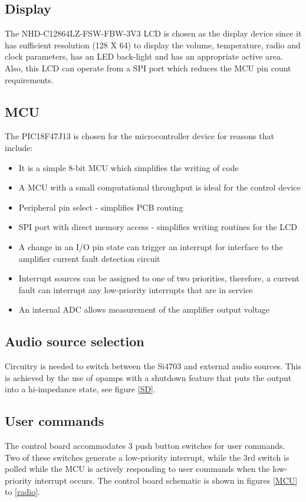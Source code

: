 \documentclass[a4paper,10pt, oneside]{article}
\begin{document}
\subsection*{Display}
The NHD-C12864LZ-FSW-FBW-3V3 LCD is chosen as the display device since it has sufficient resolution (128 X 64) to display the volume, 
temperature, radio and clock parameters, has an LED back-light and has an appropriate active area. Also, this LCD can operate from a 
SPI port which reduces the MCU pin count requirements. 
\subsection*{MCU}
The PIC18F47J13 is chosen for the microcontroller device for reasons that include:
\begin{itemize}
	\item It is a simple 8-bit MCU which simplifies the writing of code
	\item A MCU with a small computational throughput is ideal for the control device
	\item Peripheral pin select - simplifies PCB routing
	\item SPI port with direct memory access - simplifies writing routines for the LCD
	\item A change in an I/O pin state can trigger an interrupt for interface to the 
	amplifier current fault detection circuit
	\item Interrupt sources can be assigned to one of two priorities, therefore, a current fault can interrupt any 
	low-priority interrupts that are in service
	\item An internal ADC allows measurement of the amplifier output voltage
\end{itemize}
\subsection*{Audio source selection}
Circuitry is needed to switch between the Si4703 and external audio sources. This is achieved by the use of opamps with a 
shutdown feature that puts the output into a hi-impedance state, see figure \ref{SD}. 
\subsection*{User commands}
The control board accommodates 3 push button switches for user commands. Two of these switches generate a low-priority interrupt, 
while the 3rd switch is polled while the MCU is actively responding to user commands when the low-priority interrupt occurs.  
The control board schematic is shown in figures \ref{MCU} to \ref{radio}. 
\end{document}
